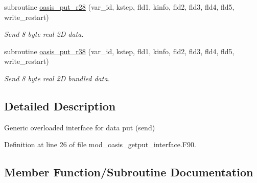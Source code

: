 \begin{DoxyCompactItemize}
subroutine \hyperlink{interfacemod__oasis__getput__interface_1_1oasis__put_a9130f78702c3d05291301efd3eb812c6}{oasis\+\_\+put\+\_\+r28} (var\+\_\+id, kstep, fld1, kinfo, fld2, fld3, fld4, fld5, write\+\_\+restart)
\begin{DoxyCompactList}\small\item\em Send 8 byte real 2D data. \end{DoxyCompactList}\item 
subroutine \hyperlink{interfacemod__oasis__getput__interface_1_1oasis__put_a9040582c4598a3f4c6df1be95ee8913e}{oasis\+\_\+put\+\_\+r38} (var\+\_\+id, kstep, fld1, kinfo, fld2, fld3, fld4, fld5, write\+\_\+restart)
\begin{DoxyCompactList}\small\item\em Send 8 byte real 2D bundled data. \end{DoxyCompactList}\end{DoxyCompactItemize}


\subsection{Detailed Description}
Generic overloaded interface for data put (send) 

Definition at line 26 of file mod\+\_\+oasis\+\_\+getput\+\_\+interface.\+F90.



\subsection{Member Function/\+Subroutine Documentation}
\mbox{\label{interfacemod__oasis__getput__interface_1_1oasis__put_a5daa7fd6bfab2e09ba23d815d6120da1}} 

